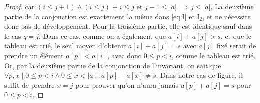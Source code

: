\documentclass{elsarticle}
\newcommand{\abs}[1]{\left\lvert#1\right\lvert}
\begin{document}
\begin{minipage}[c]{0.65\textwidth}
\begin{proof}
car $(i \le j+1) \land (i \le j) \equiv i \le j$ et $j+1 \le \abs{a} \implies j \le \abs{a}$.
La deuxième partie de la conjonction est exactement la même dans \ref{eq:I} et I$_2$,
et ne nécessite donc pas de développement.
Pour la troisième partie, elle est identique sauf dans le cas $q = j$.
Dans ce cas, comme on a également que $a[i] + a[j] > s$,
et que le tableau est trié, le seul moyen d'obtenir $a[i] + a[j] = s$ avec $a[j]$ fixé serait de prendre un élément $a[p] < a[i]$, avec donc $0 \le p < i$, comme le tableau est trié.
Or, par la deuxième partie de la conjonction de l'invariant, on sait que $\forall p, x \mid 0 \le p < i \land 0 \le x < \abs{a} :: a[p] + a[x] \ne s$.
Dans notre cas de figure, il suffit de prendre $x = j$ pour prouver qu'on n'aura jamais $a[p] + a[j] = s$ pour $0 \le p < i$.
\end{proof}
\end{minipage}
\end{document}
